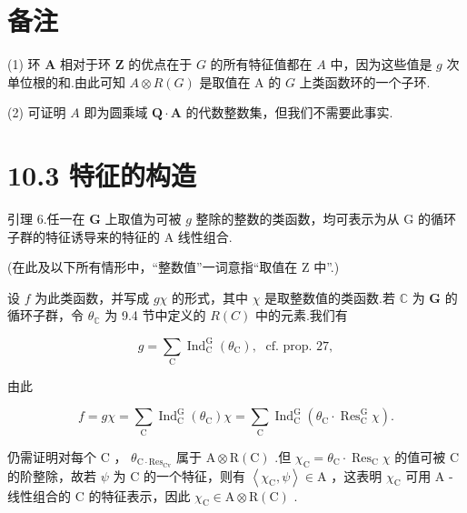 \documentclass[10pt]{article}
\begin{document}
\section*{备注}

(1) 环 \(\mathbf{A}\) 相对于环 \(\mathbf{Z}\) 的优点在于 \(G\) 的所有特征值都在 \(A\) 中，因为这些值是 \(g\) 次单位根的和.由此可知 \(A \otimes  R\left( G\right)\) 是取值在 A 的 \(G\) 上类函数环的一个子环.

(2) 可证明 \(A\) 即为圆乘域 \(\mathbf{Q} \cdot  \mathbf{A}\) 的代数整数集，但我们不需要此事实.

\section*{10.3 特征的构造}

引理 6.任一在 \(\mathbf{G}\) 上取值为可被 \(g\) 整除的整数的类函数，均可表示为从 \(\mathrm{G}\) 的循环子群的特征诱导来的特征的 A 线性组合.

(在此及以下所有情形中，“整数值”一词意指“取值在 Z 中”.)

设 \(f\) 为此类函数，并写成 \({g\chi }\) 的形式，其中 \(\chi\) 是取整数值的类函数.若 \(\mathbb{C}\) 为 \(\mathbf{G}\) 的循环子群，令 \({\theta }_{\mathbb{C}}\) 为 9.4 节中定义的 \(R\left( C\right)\) 中的元素.我们有

\[
g = \mathop{\sum }\limits_{\mathrm{C}}{\operatorname{Ind}}_{\mathrm{C}}^{\mathrm{G}}\left( {\theta }_{\mathrm{C}}\right) ,\;\text{ cf. prop. }{27},
\]

由此

\[
f = {g\chi } = \mathop{\sum }\limits_{\mathrm{C}}{\operatorname{Ind}}_{\mathrm{C}}^{\mathrm{G}}\left( {\theta }_{\mathrm{C}}\right) \chi  = \mathop{\sum }\limits_{\mathrm{C}}{\operatorname{Ind}}_{\mathrm{C}}^{\mathrm{G}}\left( {{\theta }_{\mathrm{C}} \cdot  {\operatorname{Res}}_{\mathrm{C}}^{\mathrm{G}}\chi }\right) .
\]

仍需证明对每个 \(\mathrm{C}\) ， \({\theta }_{\mathrm{C} \cdot  {\mathrm{{Res}}}_{\mathrm{{Cv}}}}\) 属于 \(\mathrm{A} \otimes  \mathrm{R}\left( \mathrm{C}\right)\) .但 \({\chi }_{\mathrm{C}} = {\theta }_{\mathrm{C}} \cdot  {\operatorname{Res}}_{\mathrm{C}}\chi\) 的值可被 \(\mathrm{C}\) 的阶整除，故若 \(\psi\) 为 \(\mathrm{C}\) 的一个特征，则有 \(\left\langle  {{\chi }_{\mathrm{C}},\psi }\right\rangle   \in  \mathrm{A}\) ，这表明 \({\chi }_{\mathrm{C}}\) 可用 \(\mathrm{A}\) -线性组合的 \(\mathrm{C}\) 的特征表示，因此 \({\chi }_{\mathrm{C}} \in  \mathrm{A} \otimes  \mathrm{R}\left( \mathrm{C}\right)\) .
\end{document}
